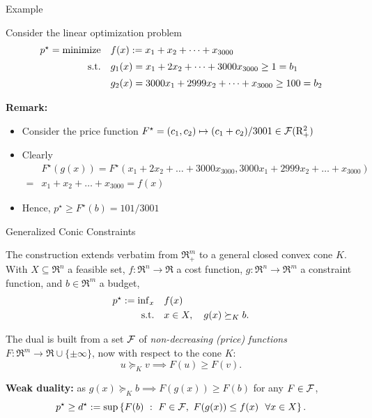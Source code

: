 \documentclass[9pt]{beamer}
\begin{document}
\begin{frame}{Example}

  Consider the linear optimization problem
  \[
    \begin{array}{rl}
      p^\star=\operatorname{minimize} & f(x) := x_1 + x_2 + \dots + x_{3000}\\[0.5em]
      \mathrm{s.t.} & g_1(x) = x_1 + 2 x_2 + \dots + 3000 x_{3000}\geq 1 = b_1 \\[0.5em]
                & g_2(x)=3000 x_1 + 2999 x_2 + \dots + x_{3000} \geq 100 = b_2
    \end{array}
  \]

  \textbf{Remark:}
  \begin{itemize}
  \item Consider the price function $F^\star= (c_1, c_2) \mapsto (c_1+c_2)/3001\in \mathcal F(\mathrm{R}^2_+)$
  \item<2-> Clearly
    \begin{align*}
      & F^\star(g(x)) = F^\star(x_1 + 2 x_2 + \dots + 3000 x_{3000}, 3000 x_1 + 2999 x_2 + \dots + x_{3000})\\
      = & x_1 + x_2 + \dots + x_{3000} = f(x)
    \end{align*}
  \item<3-> Hence, $p^\star\geq F^\star(b) = 101/3001$
  \end{itemize}
  
\end{frame}

\begin{frame}{Generalized Conic Constraints}

  The construction extends verbatim from $\Re^m_+$ to a general closed convex cone $K$. With $X \subseteq\Re^n$ a feasible set, $f:\Re^n\to\Re$ a cost function, $g:\Re^n\to\Re^m$ a constraint function, and $b\in\Re^m$ a budget,
  \[
    \begin{array}{rl}
      p^\star := \inf_x &  f(x) \\[0.3em]
      \mathrm{s.t.}  & x \in X, \quad g(x) \succeq_{K} b.
    \end{array}
  \]

  \vfill

  The dual is built from a set $\mathcal F$ of \emph{non-decreasing (price) functions} $F:\Re^m\to\Re\cup\{\pm\infty\}$, now with respect to the cone $K$:
  \[
    u \succeq_{K} v \implies F(u)\geq F(v).
  \]

  \vfill

  \textbf{Weak duality:} as $g(x)\succeq_{K} b \implies F(g(x))\geq F(b)$ for any $F\in\mathcal F$,
  \[
    p^\star \geq d^\star := \sup\left\{ F(b)\ : \ F\in\mathcal F,~F(g(x))\leq f(x)~~\forall x\in X \right\}.
  \]
\end{frame}
\end{document}
